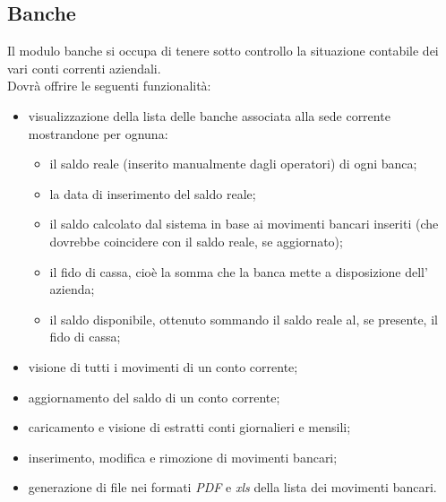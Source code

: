 	\subsection{Banche}
	Il modulo banche si occupa di tenere sotto controllo la situazione contabile dei vari conti correnti aziendali.\\
	Dovrà offrire le seguenti funzionalità:
	\begin{itemize}
		\item visualizzazione della lista delle banche associata alla sede corrente mostrandone per ognuna:
			\begin{itemize}
				\item il saldo reale (inserito manualmente dagli operatori) di ogni banca;
				\item la data di inserimento del saldo reale;
				\item il saldo calcolato dal sistema in base ai movimenti bancari inseriti (che dovrebbe coincidere con il saldo reale, se aggiornato);
				\item il fido di cassa, cioè la somma che la banca mette a disposizione dell' azienda;
				\item il saldo disponibile, ottenuto sommando il saldo reale al, se presente, il fido di cassa;
			\end{itemize}
		\item visione di tutti i movimenti di un conto corrente;
		\item aggiornamento del saldo di un conto corrente;
		\item caricamento e visione di estratti conti giornalieri e mensili;
		\item inserimento, modifica e rimozione di movimenti bancari;
		\item generazione di file nei formati \textit{PDF} e \textit{xls} della lista dei movimenti bancari.
	\end{itemize}
	
